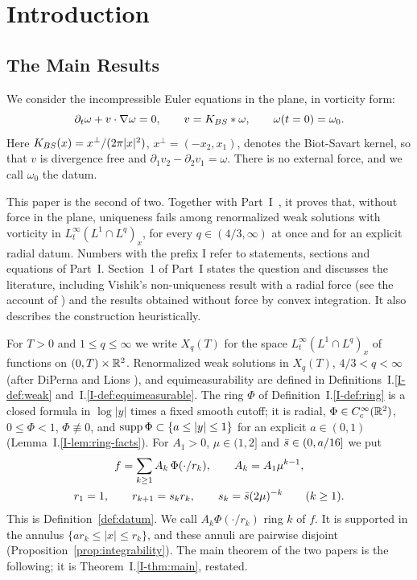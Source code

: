 \section{Introduction}

\subsection{The Main Results}

We consider the incompressible Euler equations in the plane, in vorticity form:
\begin{equation}
\label{eq:euler}
\partial_t \omega + v\cdot\nabla \omega = 0,\qquad
v = K_{BS}\ast \omega,\qquad
\omega(t=0) = \omega_0 .
\end{equation}
Here $K_{BS}(x)=x^\perp/(2\pi|x|^2)$, $x^\perp=(-x_2,x_1)$, denotes the
Biot-Savart kernel, so that $v$ is divergence free and
$\partial_1v_2-\partial_2v_1=\omega$. There is no external force, and we call
$\omega_0$ the datum.

This paper is the second of two. Together with Part~I~\cite{PartI}, it proves
that, without force in the plane, uniqueness fails among renormalized weak
solutions with vorticity in $L^\infty_t(L^1\cap L^q)_x$, for every
$q\in(4/3,\infty)$ at once and for an explicit radial datum. Numbers with the
prefix I refer to statements, sections and equations of Part~I. Section~1 of
Part~I states the question and discusses the literature, including Vishik's
non-uniqueness result with a radial force \cite{Vishik1,Vishik2} (see the
account of \cite{ABCDGJK}) and the results obtained without force by convex
integration. It also describes the construction heuristically.

For $T>0$ and $1\le q\le\infty$ we write $X_q(T)$ for the space
$L^\infty_t(L^1\cap L^q)_x$ of functions on $(0,T)\times\mathbb{R}^2$. Renormalized weak solutions in $X_q(T)$, $4/3<q<\infty$ (after
DiPerna and Lions \cite{DiPernaLions}), and equimeasurability are defined in
Definitions~I.\ref{I-def:weak} and~I.\ref{I-def:equimeasurable}. The ring $\Phi$ of
Definition~I.\ref{I-def:ring} is a closed formula in $\log|y|$ times a fixed smooth
cutoff; it is radial, $\Phi\in C_c^\infty(\mathbb{R}^2)$, $0\le\Phi<1$,
$\Phi\not\equiv0$, and $\operatorname{supp}\Phi\subset\{a\le|y|\le1\}$ for an explicit
$a\in(0,1)$ (Lemma~I.\ref{I-lem:ring-facts}). For $A_1>0$, $\mu\in(1,2]$ and
$\bar s\in(0,a/16]$ we put
\begin{equation}
\label{eq:datum}
\begin{gathered}
f=\sum_{k\ge1}A_k\,\Phi(\cdot/r_k),\qquad A_k=A_1\mu^{k-1},\\
r_1=1,\qquad r_{k+1}=s_kr_k,\qquad s_k=\bar s(2\mu)^{-k}\qquad(k\ge1).
\end{gathered}
\end{equation}
This is Definition~\ref{def:datum}. We call $A_k\Phi(\cdot/r_k)$ ring $k$ of
$f$. It is supported in the annulus $\{ar_k\le|x|\le r_k\}$, and these annuli
are pairwise disjoint (Proposition~\ref{prop:integrability}). The main theorem
of the two papers is the following; it is Theorem~I.\ref{I-thm:main}, restated.

